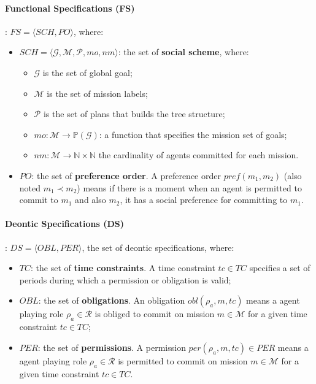 \documentclass[runningheads]{llncs}
\begin{document}
\paragraph{\textbf{Functional Specifications (FS)}}: $FS = \langle SCH, PO \rangle$, where:

\begin{itemize}
    \item $SCH = \langle\mathcal{G}, \mathcal{M}, \mathcal{P}, mo, nm \rangle$: the set of \textbf{social scheme}, where:
          \begin{itemize}
              \item $\mathcal{G}$ is the set of global goal;
              \item $\mathcal{M}$ is the set of mission labels;
              \item $\mathcal{P}$ is the set of plans that builds the tree structure;
              \item $mo: \mathcal{M} \rightarrow \mathbb{P}(\mathcal{G})$: a function that specifies the mission set of goals;
              \item $nm: \mathcal{M} \rightarrow \mathbb{N} \times \mathbb{N}$ the cardinality of agents committed for each mission.
          \end{itemize}
    \item $PO$: the set of \textbf{preference order}. A preference order $pref(m_1, m_2)$ (also noted $m_{1} \prec m_{2}$) means if there is a moment when an agent is permitted to commit to $m_{1}$ and also $m_{2}$, it has a social preference for committing to $m_{1}$.
\end{itemize}

\paragraph{\textbf{Deontic Specifications (DS)}}: $DS = \langle OBL,PER \rangle$, the set of deontic specifications, where:

\begin{itemize}
    \item $TC$: the set of \textbf{time constraints}. A time constraint $tc \in TC$ specifies a set of periods during which a permission or obligation is valid;
    \item $OBL$: the set of \textbf{obligations}. An obligation $obl(\rho_a,m,tc)$ means a agent playing role $\rho_a \in \mathcal{R}$ is obliged to commit on mission $m \in \mathcal{M}$ for a given time constraint $tc \in TC$;
    \item $PER$: the set of \textbf{permissions}. A permission $per(\rho_a,m,tc) \in PER$ means a agent playing role $\rho_a \in \mathcal{R}$ is permitted to commit on mission $m \in \mathcal{M}$ for a given time constraint $tc \in TC$.
\end{itemize}
\end{document}
